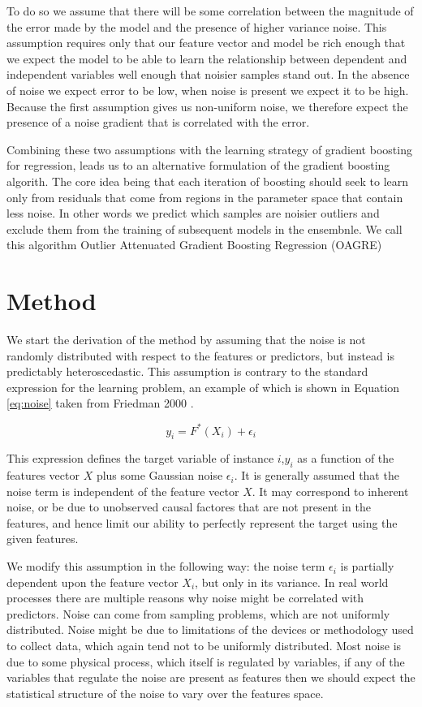 \documentclass[12pt,a4paper]{article}
\begin{document}
To do so we assume that there will be some correlation between the magnitude of the error made
by the model and the presence of higher variance noise. This assumption requires only that our feature
vector and model be rich enough that we expect the model to be able to learn the
relationship between dependent and independent variables well enough that noisier samples stand out.
In the absence of noise we expect error to be low, when noise is present we expect it to be high.
Because the first assumption gives us non-uniform noise, we therefore expect the presence
of a noise gradient that is correlated with the error.

Combining these two assumptions with the learning strategy of gradient boosting for regression, leads us to an
alternative formulation of the gradient boosting algorith. The core idea being that each iteration of boosting should
seek to learn only from residuals that come from regions in the parameter space that contain less noise. In other
words we predict which samples are noisier outliers and exclude them from the training of subsequent models in the
ensembnle. We call this algorithm Outlier Attenuated Gradient Boosting Regression (OAGRE)

\section{Method}

We start the derivation of the method by assuming that the noise is not randomly distributed with respect to the
features or predictors, but instead is predictably heteroscedastic.
This assumption is contrary to the standard expression for the learning problem,
an example of which is shown in Equation \ref{eq:noise} taken from Friedman 2000 \cite{Friedman2000}.

\begin{equation}
y_i = F^*(X_i) + \epsilon_i
\label{eq:noise}
\end{equation}

This expression defines the target variable of instance $i$,$y_i$ as a function of the features vector $X$
plus some Gaussian noise $\epsilon_i$. It is generally assumed that the noise term is independent of the 
feature vector $X$. It may correspond to inherent noise, or be due to unobserved causal factores that are
not present in the features, and hence limit our ability to perfectly represent the target using the given
features.
 
We modify this assumption in the following way: the noise term $\epsilon_i$ is partially dependent upon the
feature vector $X_i$, but only in its variance. In real world processes there are multiple reasons
why noise might be correlated with predictors. Noise can come from sampling problems,
which are not uniformly distributed. Noise might be due to limitations of the devices
or methodology used to collect data, which again tend not to be uniformly distributed.
Most noise is due to some physical process, which itself is regulated by variables,
if any of the variables that regulate the noise are present as features then we should 
expect the statistical structure of the noise to vary over the features space.
\end{document}
